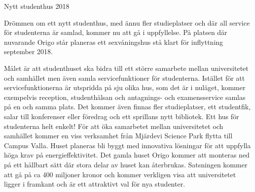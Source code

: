 Nytt studenthus 2018

Drömmen om ett nytt studenthus, med ännu fler studieplatser och där all service för studenterna är samlad, kommer nu att gå i uppfyllelse. På platsen där nuvarande Origo står planeras ett sexvåningshus stå klart för inflyttning september 2018.

Målet är att studenthuset ska bidra till ett större samarbete mellan universitetet och samhället men även samla servicefunktioner för studenterna. Istället för att servicefunktionerna är utspridda på sju olika hus, som det är i nuläget, kommer exempelvis reception, studenthälsan och antagnings- och examensservice samlas på en och samma plats. Det kommer även finnas fler studieplatser, ett studentfik, salar till konferenser eller föredrag och ett sprillans nytt bibliotek. Ett hus för studenterna helt enkelt!
För att öka samarbetet mellan universitetet och samhället kommer en viss verksamhet från Mjärdevi Science Park flytta till Campus Valla. Huset planeras bli byggt med innovativa lösningar för att uppfylla höga krav på energieffektivitet. Det gamla huset Origo kommer att monteras ned på ett hållbart sätt där stora delar av huset kan återbrukas. Satsningen kommer att gå på ca 400 miljoner kronor och kommer verkligen visa att universitetet ligger i framkant och är ett attraktivt val för nya studenter.
 
